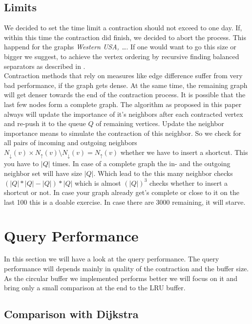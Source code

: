\subsection{Limits}

We decided to set the time limit a contraction should not exceed to one day. If, within this time the contraction did finish, we decided to abort the process. This happend for the graphs \textit{Western USA, …}. If one would want to go this size or bigger we suggest,
to achieve the vertex ordering by recursive finding balanced separators as described in \cite[Customization Contraction Hierarchies]{CCH}. 
\\
Contraction methods that rely on measures like edge difference suffer from very bad performance, if the graph gets dense. At the same time, the remaining graph will get denser towards the end of the contraction process. It is possible  that the last few nodes form a complete graph. The algorithm
as proposed in this paper always will update the importance  of it's neighbors  after each contracted vertex and re-push it to the queue $Q$ of remaining vertices. Update the neighbor importance means to simulate the contraction of this neighbor. So we check for all pairs of incoming and outgoing neighbors $N_\downarrow(v) \times N_\uparrow(v) \setminus N_\downarrow(v) = N_\uparrow(v)$ whether we have to insert a shortcut. 
This you have to $|Q|$ times. In case of a complete graph the in- and the outgoing neighbor set will have size $|Q|$. Which lead to the this many neighbor checks $(|Q| * |Q| - |Q|)*|Q|$ which is almost $(|Q|)^3$ checks whether to insert a shortcut or not. In case your graph already get's complete or close to it on the last 
100 this is a doable exercise. In case there are 3000 remaining, it will starve. 




\section{Query Performance}

In this section we will have a look at the query performance. The query performance will depends mainly in quality of the contraction and the buffer size. 
As the circular buffer we implemented performs better we will focus on it and bring only a small comparison at the end to the LRU buffer.


\subsection{Comparison with Dijkstra}

